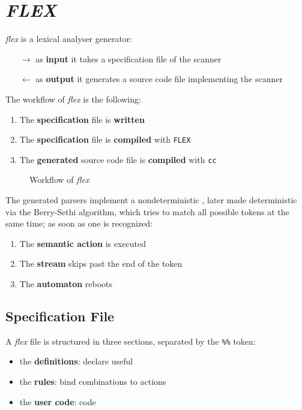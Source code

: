 \section{\textit{FLEX}}

\textit{flex} is a lexical analyser generator:
\begin{itemize}
  \item[\(\rightarrow\)] as \textbf{input} it takes a specification file of the scanner
  \item[\(\leftarrow\)] as \textbf{output} it generates a \clang source code file implementing the scanner
\end{itemize}
The workflow of \textit{flex} is the following:
\begin{enumerate}
  \item The \textbf{specification} file is \textbf{written}
  \item The \textbf{specification} file is \textbf{compiled} with \texttt{FLEX}
  \item The \textbf{generated} \clang source code file is \textbf{compiled} with \texttt{cc}
\end{enumerate}
\begin{figure}[htbp]
  \centering
  \bigskip
  \caption{Workflow of \textit{flex}}
  \label{fig:flex-workflow}
  \bigskip
\end{figure}
The generated parsers implement a nondeterministic \FSA, later made deterministic via the Berry-Sethi algorithm, which tries to match all possible tokens at the same time;
as soon as one is recognized:
\begin{enumerate}
  \item The \textbf{semantic action} is executed
  \item The \textbf{stream} skips past the end of the token
  \item The \textbf{automaton} reboots
\end{enumerate}

\subsection{Specification File}
A \textit{flex} file is structured in three sections, separated by the \texttt{\%\%} token:
\begin{itemize}
  \item the \textbf{definitions}: declare useful \re
  \item the \textbf{rules}: bind \re combinations to actions
  \item the \textbf{user code}: \clang code
\end{itemize}
